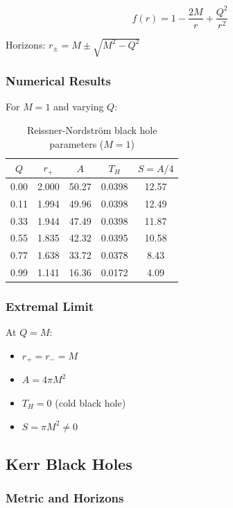 \begin{equation}
    f(r) = 1 - \frac{2M}{r} + \frac{Q^2}{r^2}
\end{equation}

Horizons: $r_\pm = M \pm \sqrt{M^2 - Q^2}$

\subsubsection{Numerical Results}

For $M = 1$ and varying $Q$:

\begin{table}[h]
\centering
\begin{tabular}{ccccc}
\toprule
$Q$ & $r_+$ & $A$ & $T_H$ & $S = A/4$ \\
\midrule
0.00 & 2.000 & 50.27 & 0.0398 & 12.57 \\
0.11 & 1.994 & 49.96 & 0.0398 & 12.49 \\
0.33 & 1.944 & 47.49 & 0.0398 & 11.87 \\
0.55 & 1.835 & 42.32 & 0.0395 & 10.58 \\
0.77 & 1.638 & 33.72 & 0.0378 & 8.43 \\
0.99 & 1.141 & 16.36 & 0.0172 & 4.09 \\
\bottomrule
\end{tabular}
\caption{Reissner-Nordstr\"om black hole parameters ($M = 1$)}
\end{table}

\subsubsection{Extremal Limit}

At $Q = M$:
\begin{itemize}
    \item $r_+ = r_- = M$
    \item $A = 4\pi M^2$
    \item $T_H = 0$ (cold black hole)
    \item $S = \pi M^2 \neq 0$
\end{itemize}

\subsection{Kerr Black Holes}

\subsubsection{Metric and Horizons}

